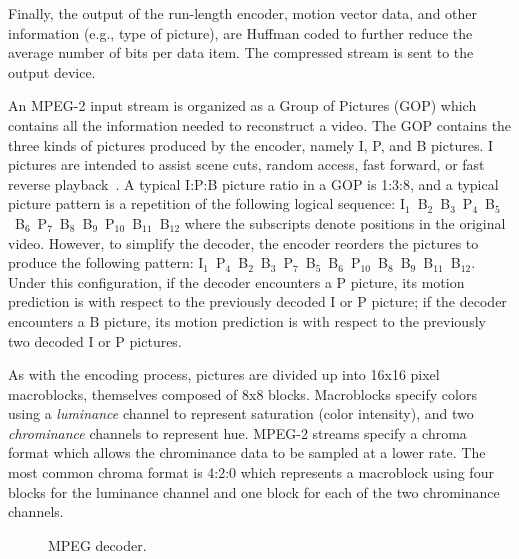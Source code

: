 Finally, the output of the run-length encoder, motion vector data,
and other information (e.g., type of picture), are Huffman coded to 
further reduce the average number of bits per data item. The compressed
stream is sent to the output device.


An MPEG-2 input stream is organized as a Group of Pictures (GOP) which
contains all the information needed to reconstruct a video. The GOP
contains the three kinds of pictures produced by the encoder, namely
I, P, and B pictures. I pictures are intended to assist scene cuts,
random access, fast forward, or fast reverse playback~\cite{MPEG2,
Page 14 6.1.1.7}. A typical I:P:B picture ratio in a GOP is 1:3:8, and
a typical picture pattern is a repetition of the following logical
sequence:
I$_1$~B$_2$~B$_3$~P$_4$~B$_5$~B$_6$~P$_7$~B$_8$~B$_9$~P$_{10}$~B$_{11}$~B$_{12}$
where the subscripts denote positions in the original video.  However,
to simplify the decoder, the encoder reorders the pictures to produce
the following pattern:
I$_1$~P$_4$~B$_2$~B$_3$~P$_7$~B$_5$~B$_6$~P$_{10}$~B$_8$~B$_9$~B$_{11}$~B$_{12}$.
Under this configuration, if the decoder encounters a P picture, its
motion prediction is with respect to the previously decoded I or P
picture; if the decoder encounters a B picture, its motion prediction
is with respect to the previously two decoded I or P pictures.

As with the encoding process, pictures are divided up into 16x16 pixel
macroblocks, themselves composed of 8x8 blocks. Macroblocks
specify colors using a {\it luminance} channel to represent saturation
(color intensity), and two {\it chrominance} channels to represent
hue. MPEG-2 streams specify a chroma format which allows the
chrominance data to be sampled at a lower rate. The most common chroma 
format is 4:2:0 which represents a macroblock using four blocks for the
luminance channel and one block for each of the two chrominance
channels. 

\begin{figure}[t]
\begin{center}
\vspace{-12pt}
 \caption{MPEG decoder.}
 \label{fig:mpeg-decoder}
\end{center}
\end{figure}

